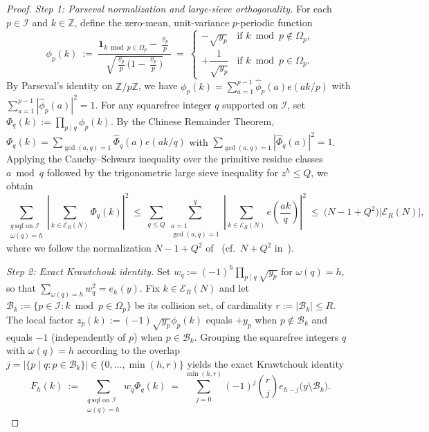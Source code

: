 \documentclass[11pt, a4paper]{article}
\theoremstyle{plain}
\theoremstyle{definition}
\newcommand{\Z}{\mathbb{Z}}
\begin{document}
\begin{proof}
\emph{Step 1: Parseval normalization and large-sieve orthogonality.}
For each $p\in\mathcal{I}$ and $k\in\Z$, define the zero-mean, unit-variance $p$-periodic function
$$\phi_p(k)\ :=\ \frac{\mathbf{1}_{k\bmod p\in\Omega_p}-\frac{\varrho_p}{p}}{\sqrt{\frac{\varrho_p}{p}\big(1-\frac{\varrho_p}{p}\big)}}\ =\ \begin{cases}-\sqrt{y_p} & \text{if }k\bmod p\notin\Omega_p,\\[4pt] +\dfrac{1}{\sqrt{y_p}} & \text{if }k\bmod p\in\Omega_p.\end{cases}$$
By Parseval's identity on $\Z/p\Z$, we have $\phi_p(k)=\sum_{a=1}^{p-1}\hat{\phi}_p(a)e(ak/p)$ with $\sum_{a=1}^{p-1}|\hat{\phi}_p(a)|^{2}=1$. For any squarefree integer $q$ supported on $\mathcal{I}$, set $\Phi_q(k):=\prod_{p\mid q}\phi_p(k)$. By the Chinese Remainder Theorem, $\Phi_q(k)=\sum_{\gcd(a,q)=1}\hat{\Phi}_q(a)e(ak/q)$ with $\sum_{\gcd(a,q)=1}|\hat{\Phi}_q(a)|^{2}=1$. Applying the Cauchy--Schwarz inequality over the primitive residue classes $a\bmod q$ followed by the trigonometric large sieve inequality for $z^{h}\le Q$, we obtain
\begin{equation}\label{eq:montgomery_ortho_bound}
\sum_{\substack{q\ \text{sqf on }\mathcal{I}\\ \omega(q)=h}}\left|\sum_{k\in\mathcal{E}_R(N)}\Phi_q(k)\right|^{2}\ \le\ \sum_{q\le Q}\sum_{\substack{a=1\\ \gcd(a,q)=1}}^{q}\left|\sum_{k\in\mathcal{E}_R(N)}e\!\left(\frac{ak}{q}\right)\right|^{2}\ \le\ \big(N-1+Q^{2}\big)|\mathcal{E}_R(N)|,
\end{equation}
where we follow the normalization $N-1+Q^2$ of~\cite{montgomery1971} (cf.\ $N+Q^{2}$ in~\cite{bombieri}).

\medskip\noindent\emph{Step 2: Exact Krawtchouk identity.}
Set $w_q:=(-1)^{h}\prod_{p\mid q}\sqrt{y_p}$ for $\omega(q)=h$, so that $\sum_{\omega(q)=h}w_q^{2}=e_h(y)$. Fix $k\in\mathcal{E}_R(N)$ and let $\mathcal{B}_k:=\{p\in\mathcal{I}:k\bmod p\in\Omega_p\}$ be its collision set, of cardinality $r:=|\mathcal{B}_k|\le R$. The local factor $z_p(k):=(-1)\sqrt{y_p}\phi_p(k)$ equals $+y_p$ when $p\notin\mathcal{B}_k$ and equals $-1$ (independently of $p$) when $p\in\mathcal{B}_k$. Grouping the squarefree integers $q$ with $\omega(q)=h$ according to the overlap $j=|\{p\mid q:p\in\mathcal{B}_k\}|\in\{0,\dots,\min(h,r)\}$ yields the exact Krawtchouk identity
\begin{equation}\label{eq:krawtchouk_identity}
F_h(k)\ :=\ \sum_{\substack{q\ \text{sqf on }\mathcal{I}\\ \omega(q)=h}}w_q\Phi_q(k)\ =\ \sum_{j=0}^{\min(h,r)}(-1)^{j}\binom{r}{j}e_{h-j}\big(y\setminus\mathcal{B}_k\big).
\end{equation}


\end{proof}
\end{document}
